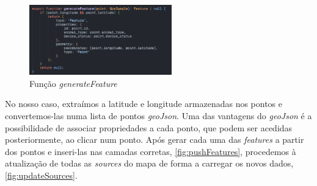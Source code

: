 \begin{figure}[!h]
	\centering
	\includegraphics[width=0.55\textwidth]{figs/generateFeature.png}
	\caption{Função \textit{generateFeature}}
	\label{fig:generateFeature}
\end{figure}

No nosso caso, extraímos a latitude e longitude armazenadas nos pontos e convertemos-las numa lista de pontos \textit{geoJson}. Uma das vantagens do \textit{geoJson} é a possibilidade de associar propriedades a cada ponto, que podem ser acedidas posteriormente, ao clicar num ponto. Após gerar cada uma das \textit{features} a partir dos pontos e inseri-las nas camadas corretas, \autoref{fig:pushFeatures}, procedemos à atualização de todas as \textit{sources} do mapa de forma a carregar os novos dados, \autoref{fig:updateSources}.


